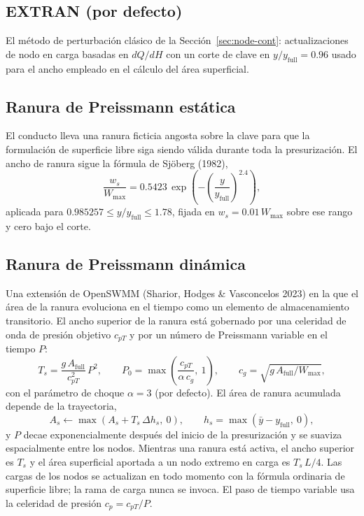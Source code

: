 \documentclass[11pt,a4paper]{article}
\begin{document}
\subsection{EXTRAN (por defecto)}

El método de perturbación clásico de la Sección~\ref{sec:node-cont}:
actualizaciones de nodo en carga basadas en $dQ/dH$ con un corte de clave en
$y/y_{\mathrm{full}} = 0.96$ usado para el ancho empleado en el cálculo del
área superficial.

\subsection{Ranura de Preissmann estática}

El conducto lleva una ranura ficticia angosta sobre la clave para que la
formulación de superficie libre siga siendo válida durante toda la
presurización. El ancho de ranura sigue la fórmula de Sj{\"o}berg (1982),
\begin{equation}
  \frac{w_s}{W_{\max}} = 0.5423\,
  \exp\!\left(-\left(\frac{y}{y_{\mathrm{full}}}\right)^{2.4}\right),
\end{equation}
aplicada para $0.985257 \le y/y_{\mathrm{full}} \le 1.78$, fijada en
$w_s = 0.01\,W_{\max}$ sobre ese rango y cero bajo el corte.

\subsection{Ranura de Preissmann dinámica}

Una extensión de OpenSWMM (Sharior, Hodges \& Vasconcelos 2023) en la que el
área de la ranura evoluciona en el tiempo como un elemento de almacenamiento
transitorio. El ancho superior de la ranura está gobernado por una celeridad de
onda de presión objetivo $c_{pT}$ y por un número de Preissmann variable en el
tiempo $P$:
\begin{equation}
  T_s = \frac{g\,A_{\mathrm{full}}}{c_{pT}^{2}}\,P^{2},
  \qquad
  P_{0} = \max\!\left(\frac{c_{pT}}{\alpha\,c_g},\ 1\right),
  \qquad c_g = \sqrt{g\,A_{\mathrm{full}}/W_{\max}},
\end{equation}
con el parámetro de choque $\alpha = 3$ (por defecto). El área de ranura
acumulada depende de la trayectoria,
\begin{equation}
  A_s \leftarrow \max\!\left(A_s + T_s\,\Delta h_s,\ 0\right),
  \qquad h_s = \max(\bar y - y_{\mathrm{full}},\ 0),
\end{equation}
y $P$ decae exponencialmente después del inicio de la presurización y se suaviza
espacialmente entre los nodos. Mientras una ranura está activa, el ancho
superior es $T_s$ y el área superficial aportada a un nodo extremo en carga es
$T_s\,L/4$. Las cargas de los nodos se actualizan en todo momento con la
fórmula ordinaria de superficie libre; la rama de carga nunca se invoca. El
paso de tiempo variable usa la celeridad de presión $c_p = c_{pT}/P$.
\end{document}
